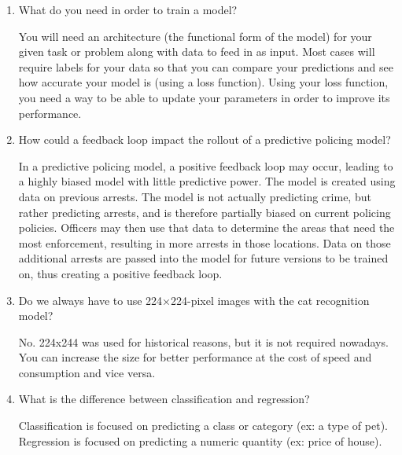 \documentclass[12pt,a4paper]{article}
\begin{document}
\begin{enumerate}
\newpage

\item What do you need in order to train a model? \\

\smallbreak

You will need an architecture (the functional form of the model) for your given task or problem along with data to feed in as input. Most cases will require labels for your data so that you can compare your predictions and see how accurate your model is (using a loss function). Using your loss function, you need a way to be able to update your parameters in order to improve its performance.

\bigbreak

\item How could a feedback loop impact the rollout of a predictive policing model? \\

\smallbreak

In a predictive policing model, a positive feedback loop may occur, leading to a highly biased model with little predictive power. The model is created using data on previous arrests. The model is not actually predicting crime, but rather predicting arrests, and is therefore partially biased on current policing policies. Officers may then use that data to determine the areas that need the most enforcement, resulting in more arrests in those locations. Data on those additional arrests are passed into the model for future versions to be trained on, thus creating a positive feedback loop.

\bigbreak

\item Do we always have to use 224×224-pixel images with the cat recognition model? \\

\smallbreak

No. 224x244 was used for historical reasons, but it is not required nowadays. You can increase the size for better performance at the cost of speed and consumption and vice versa.

\bigbreak

\item What is the difference between classification and regression? \\

\smallbreak

Classification is focused on predicting a class or category (ex: a type of pet). Regression is focused on predicting a numeric quantity (ex: price of house).


\end{enumerate}
\end{document}
